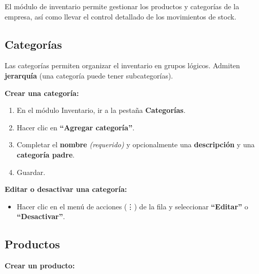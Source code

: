 El módulo de inventario permite gestionar los productos y categorías de la empresa, así como llevar el control detallado de los movimientos de stock.

\subsection{Categorías}\label{categoruxedas}

Las categorías permiten organizar el inventario en grupos lógicos. Admiten \textbf{jerarquía} (una categoría puede tener subcategorías).

\textbf{Crear una categoría:}

\begin{enumerate}
\def\labelenumi{\arabic{enumi}.}
\tightlist
\item
  En el módulo Inventario, ir a la pestaña \textbf{Categorías}.
\item
  Hacer clic en \textbf{``Agregar categoría''}.
\item
  Completar el \textbf{nombre} \emph{(requerido)} y opcionalmente una \textbf{descripción} y una \textbf{categoría padre}.
\item
  Guardar.
\end{enumerate}

\textbf{Editar o desactivar una categoría:}

\begin{itemize}
\tightlist
\item
  Hacer clic en el menú de acciones (⋮) de la fila y seleccionar \textbf{``Editar''} o \textbf{``Desactivar''}.
\end{itemize}

\subsection{Productos}\label{productos}

\textbf{Crear un producto:}

